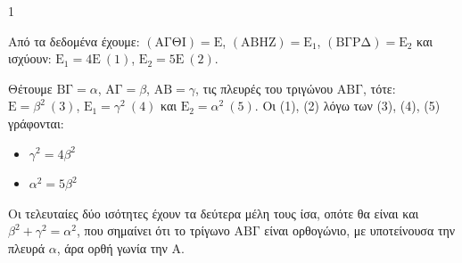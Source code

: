 \begin{ylh}{1}
    \item [Γεωμετρία, Πυθαγόρειο Θεώρημα, Εμβαδά]
\end{ylh}
\begin{figure} %
\centering
{}
\end{figure}
Από τα δεδομένα έχουμε: $(\mathrm{A\Gamma\Theta I}) = \text{E}$, $(\mathrm{ABHZ}) = \text{E}_1$, $(\mathrm{B\Gamma P \Delta}) = \text{E}_2$ και ισχύουν: $\text{E}_1=4\text{E} \ (1)$, $\text{E}_2=5\text{E} \ (2)$.
\begin{alist}
    \item Θέτουμε $\mathrm{B\Gamma} = \alpha$, $\mathrm{A\Gamma} = \beta$, $\mathrm{AB} = \gamma$, τις πλευρές του τριγώνου $\mathrm{AB\Gamma}$, τότε: $\text{E} = \beta^2 \ (3)$, $\text{E}_1 = \gamma^2 \ (4)$ και $\text{E}_2 = \alpha^2 \ (5)$. Οι (1), (2) λόγω των (3), (4), (5) γράφονται:
    \begin{itemize}
        \item $\gamma^2 = 4\beta^2$
        \item $\alpha^2 = 5\beta^2$
    \end{itemize}
    \item Οι τελευταίες δύο ισότητες έχουν τα δεύτερα μέλη τους ίσα, οπότε θα είναι και $\beta^2 + \gamma^2 = \alpha^2$, που σημαίνει ότι το τρίγωνο $\mathrm{AB\Gamma}$ είναι ορθογώνιο, με υποτείνουσα την πλευρά $\alpha$, άρα ορθή γωνία την $\mathrm{A}$.
\end{alist}